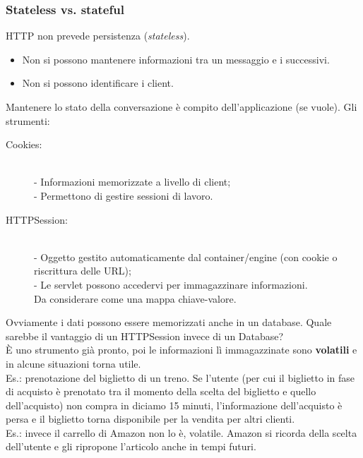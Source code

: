 \subsubsection{Stateless vs. stateful}
HTTP non prevede persistenza (\textit{stateless}).
\begin{itemize}
    \item Non si possono mantenere informazioni tra un messaggio e i successivi.
    \item Non si possono identificare i client.
\end{itemize}
Mantenere lo stato della conversazione è compito dell'applicazione (se vuole). Gli strumenti:
\begin{description}
    \item[Cookies:] 
    \\- Informazioni memorizzate a livello di client;
    \\- Permettono di gestire sessioni di lavoro.
    \item[HTTPSession:] 
    \\- Oggetto gestito automaticamente dal container/engine (con cookie o riscrittura delle URL);
    \\- Le servlet possono accedervi per immagazzinare informazioni.
    \\Da considerare come una mappa chiave-valore.
\end{description}
Ovviamente i dati possono essere memorizzati anche in un database. Quale sarebbe il vantaggio di un HTTPSession invece di un Database?
\\\`E uno strumento già pronto, poi le informazioni lì immagazzinate sono \textbf{volatili} e in alcune situazioni torna utile.
\\Es.: prenotazione del biglietto di un treno. Se l'utente (per cui il biglietto in fase di acquisto è prenotato tra il momento della scelta del biglietto e quello dell'acquisto) non compra in diciamo 15 minuti, l'informazione dell'acquisto è persa e il biglietto torna disponibile per la vendita per altri clienti.
\\Es.: invece il carrello di Amazon non lo è, volatile. Amazon si ricorda della scelta dell'utente e gli ripropone l'articolo anche in tempi futuri.

